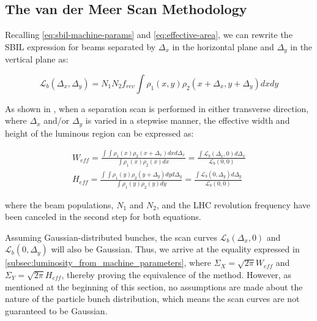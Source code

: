 \subsection{The van der Meer Scan Methodology}
\label{subsec:the_van_der_meer_scan_methodology}

Recalling \autoref{eq:sbil-machine-params} and \autoref{eq:effective-area}, we can rewrite the SBIL expression for beams separated by $\Delta_x$ in the horizontal plane and $\Delta_y$ in the vertical plane as:

\begin{equation}
    \label{eq:sbil_separating_planes}
    \mathcal{L}_b \left( \Delta_x, \Delta_y \right) = N_1 N_2 f_{rev} \int \rho_1 (x, y) \rho_2 (x + \Delta_x, y + \Delta_y) dx dy
\end{equation}

As shown in \cite{vanderMeer:296752}, when a separation scan is performed in either transverse direction, where $\Delta_x$ and/or $\Delta_y$ is varied in a stepwise manner, the effective width and height of the luminous region can be expressed as:

\begin{equation}
    \begin{aligned}
        \label{eq:effective_width_height_scan}
        W_{eff} = \frac{\int \int \rho_1 (x) \rho_2 (x + \Delta_x) dx d\Delta_x}{\int \rho_1 (x) \rho_2 (x) dx} = \frac{\int \mathcal{L}_b \left( \Delta_x, 0 \right) d\Delta_x}{\mathcal{L}_b \left( 0, 0 \right)} \\
        H_{eff} = \frac{\int \int \rho_1 (y) \rho_2 (y + \Delta_y) dy d\Delta_y}{\int \rho_1 (y) \rho_2 (y) dy} = \frac{\int \mathcal{L}_b \left( 0, \Delta_y \right) d\Delta_y}{\mathcal{L}_b \left( 0, 0 \right)}
    \end{aligned}
\end{equation}

where the beam populations, $N_1$ and $N_2$, and the LHC revolution frequency have been canceled in the second step for both equations.

Assuming Gaussian-distributed bunches, the scan curves $\mathcal{L}_b \left( \Delta_x, 0 \right)$ and $\mathcal{L}_b \left( 0, \Delta_y \right)$ will also be Gaussian. Thus, we arrive at the equality expressed in \autoref{subsec:luminosity_from_machine_parameters}, where $\Sigma_X = \sqrt{2\pi} W_{eff}$ and $\Sigma_Y = \sqrt{2\pi} H_{eff}$, thereby proving the equivalence of the method. However, as mentioned at the beginning of this section, no assumptions are made about the nature of the particle bunch distribution, which means the scan curves are not guaranteed to be Gaussian.

